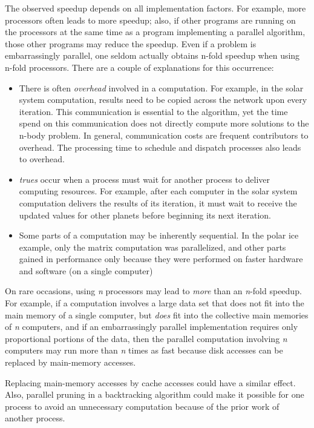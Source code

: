 \documentclass[letterpaper,10pt,english]{sphinxmanual}
\begin{document}
The observed speedup depends on all implementation factors.  For example, more processors often leads to more speedup; also, if other programs are running on the processors at the same time as a program implementing a parallel algorithm, those other programs may reduce the speedup.  Even if a problem is embarrassingly parallel, one seldom actually obtains n-fold speedup when using n-fold processors.  There are a couple of explanations for this occurrence:
\begin{itemize}
\item {} 
There is often \emph{overhead} involved in a computation. For example, in the solar system computation, results need to be copied across the network upon every iteration. This communication is essential to the algorithm, yet the time spend on this communication does not directly compute more solutions to the n-body problem.
In general, communication costs are frequent contributors to overhead. The processing time to schedule and dispatch processes also leads to overhead.

\item {} 
\emph{trues} occur when a process must wait for another process to deliver computing resources. For example, after each computer in the solar system computation delivers the results of its iteration, it must wait to receive the updated values for other planets before beginning its next iteration.

\item {} 
Some parts of a computation may be inherently sequential. In the polar ice example, only the matrix computation was parallelized, and other parts gained in performance only because they were performed on faster hardware and software (on a single computer)

\end{itemize}

On rare occasions, using \emph{n} processors may lead to \emph{more} than an \emph{n}-fold speedup.  For example, if a computation involves a large data set that does not fit into the main memory of a single computer, but \emph{does} fit into the collective main memories of \emph{n} computers, and if an embarrassingly parallel implementation requires only proportional portions of the data, then the parallel computation involving \emph{n} computers may run more than \emph{n} times as fast because disk accesses can be replaced by main-memory accesses.

Replacing main-memory accesses by cache accesses could have a similar effect. Also, parallel pruning in a backtracking algorithm could make it possible for one process to avoid an unnecessary computation because of the prior work of another process.
\end{document}
